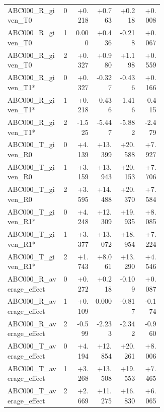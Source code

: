 \begin{longtable}{@{}p{0.36\linewidth}rrrrr@{}}
ABC000\_\allowbreak{}R\_\allowbreak{}given\_\allowbreak{}T0 & 0 & +0.218 & +0.763 & +0.218 & +0.008 \\
ABC000\_\allowbreak{}R\_\allowbreak{}given\_\allowbreak{}T0 & 1 & 0.000 & +0.436 & -0.218 & +0.067 \\
ABC000\_\allowbreak{}R\_\allowbreak{}given\_\allowbreak{}T0 & 2 & +0.327 & +0.980 & +1.198 & +0.559 \\
ABC000\_\allowbreak{}R\_\allowbreak{}given\_\allowbreak{}T1* & 0 & +0.327 & -0.327 & -0.436 & +0.166 \\
ABC000\_\allowbreak{}R\_\allowbreak{}given\_\allowbreak{}T1* & 1 & +0.218 & -0.436 & -1.416 & -0.415 \\
ABC000\_\allowbreak{}R\_\allowbreak{}given\_\allowbreak{}T1* & 2 & -1.525 & -5.447 & -5.882 & -2.479 \\
ABC000\_\allowbreak{}T\_\allowbreak{}given\_\allowbreak{}R0 & 0 & +4.139 & +13.399 & +20.588 & +7.927 \\
ABC000\_\allowbreak{}T\_\allowbreak{}given\_\allowbreak{}R0 & 1 & +3.159 & +13.943 & +20.153 & +7.706 \\
ABC000\_\allowbreak{}T\_\allowbreak{}given\_\allowbreak{}R0 & 2 & +3.595 & +14.488 & +20.370 & +7.584 \\
ABC000\_\allowbreak{}T\_\allowbreak{}given\_\allowbreak{}R1* & 0 & +4.248 & +12.309 & +19.935 & +8.085 \\
ABC000\_\allowbreak{}T\_\allowbreak{}given\_\allowbreak{}R1* & 1 & +3.377 & +13.072 & +18.954 & +7.224 \\
ABC000\_\allowbreak{}T\_\allowbreak{}given\_\allowbreak{}R1* & 2 & +1.743 & +8.061 & +13.290 & +4.546 \\
ABC000\_\allowbreak{}R\_\allowbreak{}average\_\allowbreak{}effect & 0 & +0.272 & +0.218 & -0.109 & +0.087 \\
ABC000\_\allowbreak{}R\_\allowbreak{}average\_\allowbreak{}effect & 1 & +0.109 & 0.000 & -0.817 & -0.174 \\
ABC000\_\allowbreak{}R\_\allowbreak{}average\_\allowbreak{}effect & 2 & -0.599 & -2.233 & -2.342 & -0.960 \\
ABC000\_\allowbreak{}T\_\allowbreak{}average\_\allowbreak{}effect & 0 & +4.194 & +12.854 & +20.261 & +8.006 \\
ABC000\_\allowbreak{}T\_\allowbreak{}average\_\allowbreak{}effect & 1 & +3.268 & +13.508 & +19.553 & +7.465 \\
ABC000\_\allowbreak{}T\_\allowbreak{}average\_\allowbreak{}effect & 2 & +2.669 & +11.275 & +16.830 & +6.065 \\

\end{longtable}
